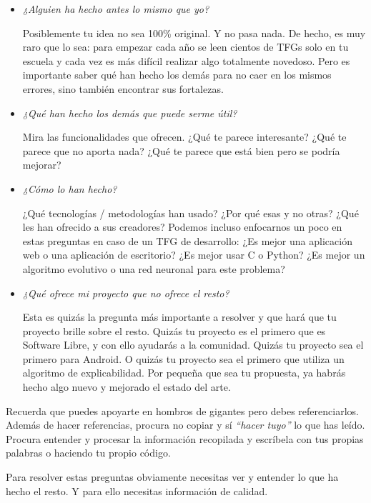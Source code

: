 \begin{itemize}
    \item \textit{¿Alguien ha hecho antes lo mismo que yo?}
    
Posiblemente tu idea no sea 100\% original. Y no pasa nada. De hecho, es muy raro que lo sea: para empezar cada año se leen cientos de TFGs solo en tu escuela y cada vez es más difícil realizar algo totalmente novedoso. Pero es importante saber qué han hecho los demás para no caer en los mismos errores, sino también encontrar sus fortalezas.

\item \textit{¿Qué han hecho los demás que puede serme útil?}

Mira las funcionalidades que ofrecen. ¿Qué te parece interesante? ¿Qué te parece que no aporta nada? ¿Qué te parece que está bien pero se podría mejorar?

\item \textit{¿Cómo lo han hecho?} 

¿Qué tecnologías / metodologías han usado? ¿Por qué esas y no otras? ¿Qué les han ofrecido a sus creadores? Podemos incluso enfocarnos un poco en estas preguntas en caso de un TFG de desarrollo: ¿Es mejor una aplicación web o una aplicación de escritorio? ¿Es mejor usar C o Python? ¿Es mejor un algoritmo evolutivo o una red neuronal para este problema?

\item \textit{¿Qué ofrece mi proyecto que no ofrece el resto?} 

Esta es quizás la pregunta más importante a resolver y que hará que tu proyecto brille sobre el resto. Quizás tu proyecto es el primero que es Software Libre, y con ello ayudarás a la comunidad. Quizás tu proyecto sea el primero para Android. O quizás tu proyecto sea el primero que utiliza un algoritmo de explicabilidad. Por pequeña que sea tu propuesta, ya habrás hecho algo nuevo y mejorado el estado del arte.

\end{itemize}

Recuerda que puedes apoyarte en hombros de gigantes pero debes referenciarlos. Además de hacer referencias, procura no copiar y sí {\it ``hacer tuyo''} lo que has leído. Procura entender y procesar la información recopilada y escríbela con tus propias palabras o haciendo tu propio código.

Para resolver estas preguntas obviamente necesitas ver y entender lo que ha hecho el resto. Y para ello necesitas información de calidad.


